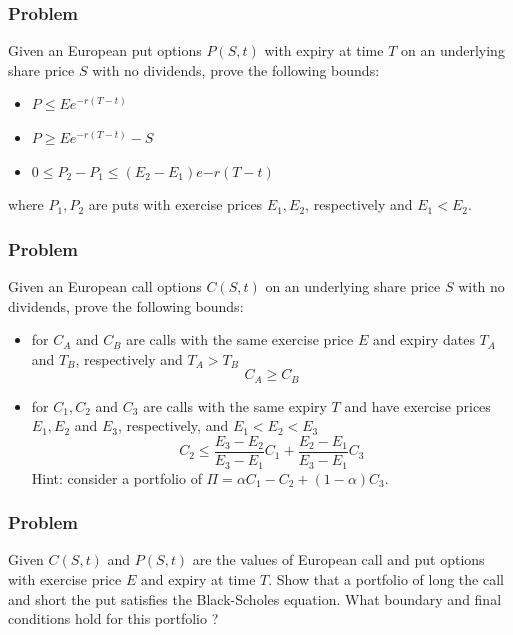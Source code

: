 \subsubsection{Problem}
Given an European put options $P(S,t)$ with expiry at time $T$ on an underlying share price $S$ with no dividends, prove the following bounds:
\begin{itemize}
    \setlength\itemsep{0em}
    \item $P \leq Ee^{-r(T-t)}$
    \item $P \geq Ee^{-r(T-t)} - S$
    \item $0 \leq P_2 - P_1 \leq (E_2 - E_1) e{-r(T-t)}$
\end{itemize}
where $P_1, P_2$ are puts with exercise prices $E_1, E_2$, respectively and $E_1 < E_2$.


\subsubsection{Problem}
Given an European call options $C(S,t)$ on an underlying share price $S$ with no dividends, prove the following bounds:
\begin{itemize}
    \setlength\itemsep{0em}
    \item for $C_A$ and $C_B$ are calls with the same exercise price $E$ and expiry dates $T_A$ and $T_B$, respectively and $T_A > T_B$
    \begin{equation}
        C_A \geq C_B
    \end{equation}
    \item for $C_1, C_2$ and $C_3$ are calls with the same expiry $T$ and have exercise prices $E_1, E_2$ and $E_3$, respectively, and $E_1 < E_2 < E_3$
    \begin{equation}
        C_2 \leq \frac{E_3 - E_2}{E_3 - E_1} C_1 + \frac{E_2 - E_1}{E_3 - E_1} C_3
    \end{equation}
    Hint: consider a portfolio of $\Pi = \alpha C_1 - C_2 + (1-\alpha) C_3$.
\end{itemize}


\subsubsection{Problem}
Given $C(S,t)$ and $P(S,t)$ are the values of European call and put options with exercise price $E$ and expiry at time $T$. Show that a portfolio of long the call and short the put satisfies the Black-Scholes equation. What boundary and final conditions hold for this portfolio ?


